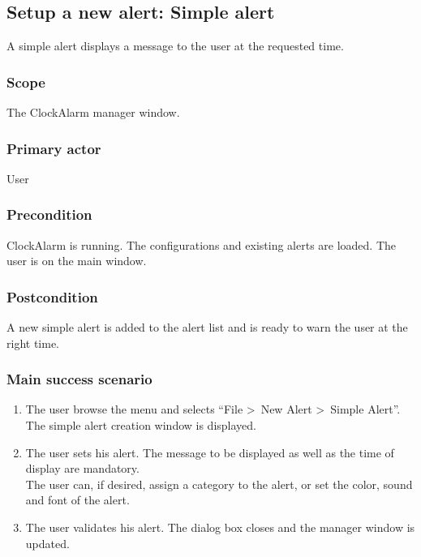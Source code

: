 \subsection{Setup a new alert: Simple alert}\label{subsec:usecase_add_simple_alert}
A simple alert displays a message to the user at the requested time.
\subsubsection{Scope}
The ClockAlarm manager window.
\subsubsection{Primary actor}
User
\subsubsection{Precondition}
ClockAlarm is running. The configurations and existing alerts are loaded. The user is on the main window.
\subsubsection{Postcondition}
A new simple alert is added to the alert list and is ready to warn the user at the right time.
\subsubsection{Main success scenario}
\begin{enumerate}
	\item The user browse the menu and selects ``File \textgreater~New Alert \textgreater~Simple Alert''. The simple alert creation window is displayed. 
	\item\label{itm:ucaa_enter_sa} The user sets his alert. The message to be displayed as well as the time of display are mandatory. \\The user can, if desired, assign a category to the alert, or set the color, sound and font of the alert.
	\item\label{itm:ucaa_validate_sa} The user validates his alert. The dialog box closes and the manager window is updated.
\end{enumerate}

